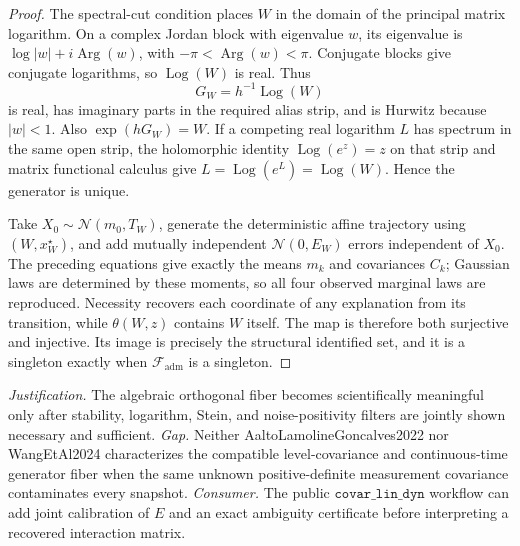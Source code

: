 \documentclass{article}
\begin{document}
\begin{proof}
The spectral-cut condition places \(W\) in the domain of the principal matrix logarithm.  On a complex Jordan block with eigenvalue \(w\), its eigenvalue is \(\log|w|+i\operatorname{Arg}(w)\), with \(-\pi<\operatorname{Arg}(w)<\pi\).  Conjugate blocks give conjugate logarithms, so \(\operatorname{Log}(W)\) is real.  Thus
\[
 G_W=h^{-1}\operatorname{Log}(W)
\]
is real, has imaginary parts in the required alias strip, and is Hurwitz because \(|w|<1\).  Also \(\exp(hG_W)=W\).  If a competing real logarithm \(L\) has spectrum in the same open strip, the holomorphic identity \(\operatorname{Log}(e^z)=z\) on that strip and matrix functional calculus give \(L=\operatorname{Log}(e^L)=\operatorname{Log}(W)\).  Hence the generator is unique.

Take \(X_0\sim\mathcal N(m_0,T_W)\), generate the deterministic affine trajectory using \((W,x_W^\star)\), and add mutually independent \(\mathcal N(0,E_W)\) errors independent of \(X_0\).  The preceding equations give exactly the means \(m_k\) and covariances \(C_k\); Gaussian laws are determined by these moments, so all four observed marginal laws are reproduced.  Necessity recovers each coordinate of any explanation from its transition, while \(\theta(W,z)\) contains \(W\) itself.  The map is therefore both surjective and injective.  Its image is precisely the structural identified set, and it is a singleton exactly when \(\mathcal F_{\mathrm{adm}}\) is a singleton.
\end{proof}
\par\smallskip\noindent \textit{Justification.} The algebraic orthogonal fiber becomes scientifically meaningful only after stability, logarithm, Stein, and noise-positivity filters are jointly shown necessary and sufficient. \textit{Gap.} Neither AaltoLamolineGoncalves2022 nor WangEtAl2024 characterizes the compatible level-covariance and continuous-time generator fiber when the same unknown positive-definite measurement covariance contaminates every snapshot. \textit{Consumer.} The public \(\texttt{covar\_lin\_dyn}\) workflow can add joint calibration of \(E\) and an exact ambiguity certificate before interpreting a recovered interaction matrix.
\end{document}
